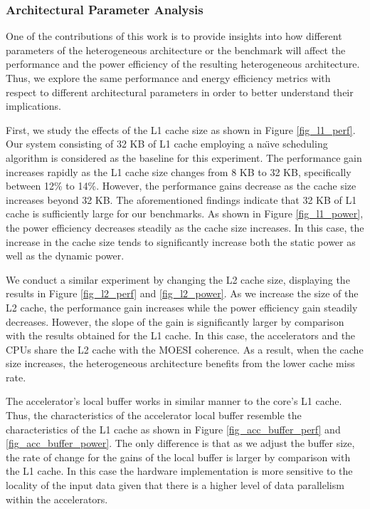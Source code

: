 \subsubsection{Architectural Parameter Analysis}

One of the contributions of this work is to provide insights into how
different parameters of the heterogeneous architecture or the
benchmark will affect the performance and the power efficiency of the
resulting heterogeneous architecture. Thus, we explore the same performance and
energy efficiency metrics with respect to different architectural parameters in order to
 better understand their implications. 

First, we study the effects of the L1 cache size as shown in Figure \ref{fig_l1_perf}. Our
system consisting of 32 KB of L1 cache employing a na\"{\i}ve scheduling algorithm is considered as the
baseline for this experiment. The performance gain increases rapidly as the
L1 cache size changes from 8 KB to 32 KB, specifically between 12\% to 14\%.
However, the performance gains decrease as the cache size increases beyond 32
KB. The aforementioned findings indicate that 32 KB of L1 cache is sufficiently large
 for our benchmarks. As shown in Figure
\ref{fig_l1_power}, the power efficiency decreases
steadily as the cache size increases. In this case, the increase in the cache size 
tends to significantly increase both the static power as well as the dynamic power. 

We conduct a similar experiment by changing the L2 cache size, displaying
the results in Figure \ref{fig_l2_perf} and \ref{fig_l2_power}. As
we increase the size of the L2 cache, the performance gain increases while the
power efficiency gain steadily decreases. However, the slope of the gain is significantly larger by comparison with the results obtained for 
the L1 cache. In this case, the accelerators and the CPUs share the L2 cache with the MOESI coherence. As a result, when the cache size 
increases, the heterogeneous architecture benefits from the lower cache miss rate. 

The accelerator's local buffer works in similar manner to the core's L1 cache. Thus, the characteristics of the accelerator local buffer 
resemble the characteristics of the L1 cache as shown in Figure \ref{fig_acc_buffer_perf} and \ref{fig_acc_buffer_power}. 
The only difference is that as we adjust the buffer size, the rate of change for the gains of the local buffer is larger 
by comparison with the L1 cache. In this case the hardware implementation is more sensitive to the locality of the input data
 given that there is a higher level of data parallelism within the accelerators. 

